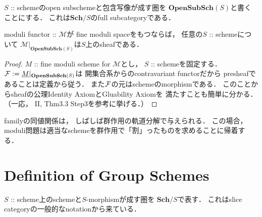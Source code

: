 \documentclass[a4paper]{jsarticle}
\newcommand{\Sch}{\mathbf{Sch}}
\newcommand{\OpenSubSch}{\mathbf{OpenSubSch}}
\newcommand{\func}[1]{\underline{#1}}
\newcommand{\ftorM}{\mathcal{M}}
\begin{document}
    \begin{Prop}
        $S$ :: schemeのopen subschemeと包含写像が成す圏を
        $\OpenSubSch(S)$と書くことにする．
        これは$\Sch/S$のfull subcategoryである．

        moduli functor :: $\ftorM$が
        fine moduli spaceをもつならば，
        任意の$S$ :: schemeについて
        $\ftorM|_{\OpenSubSch(S)}$は$S$上のsheafである．
    \end{Prop}
    \begin{proof}
        $M$ :: fine moduli scheme for $\ftorM$とし，
        $S$ :: schemeを固定する．
        $\shF:=\func{M}|_{\OpenSubSch(S)}$は
        開集合系からのcontravariant functorだから
        presheafであることは定義から従う．
        また$\mathcal{F}$の元はschemeのmorphismである．
        このことからsheafの公理Identity AxiomとGluability Axiomを
        満たすことも簡単に分かる．
        （一応，\cite{HarAG} II, Thm3.3 Step3を参考に挙げる．）
    \end{proof}

    familyの同値関係は，
    しばしば群作用の軌道分解で与えられる．
    この場合，
    moduli問題は適当なschemeを群作用で「割」ったものを求めることに帰着する．

\section{Definition of Group Schemes}
    $S$ :: scheme上のschemeと$S$-morphismが成す圏を
    \textbf{$\Sch/S$}で表す．
    これはslice categoryの一般的なnotationから来ている．
\end{document}
